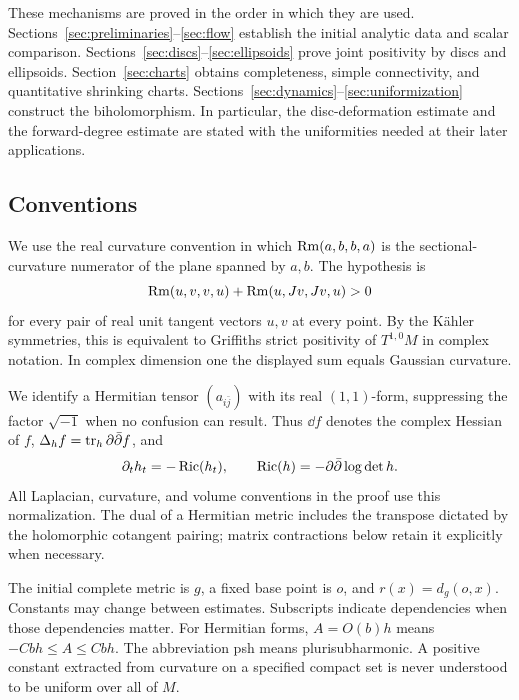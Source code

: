 These mechanisms are proved in the order in which they are used.
Sections~\ref{sec:preliminaries}--\ref{sec:flow} establish the initial
analytic data and scalar comparison. Sections~\ref{sec:discs}--\ref{sec:ellipsoids}
prove joint positivity by discs and ellipsoids.
Section~\ref{sec:charts} obtains completeness, simple connectivity,
and quantitative shrinking charts.
Sections~\ref{sec:dynamics}--\ref{sec:uniformization} construct the
biholomorphism. In particular, the disc-deformation estimate and
the forward-degree estimate are stated with the uniformities
needed at their later applications.

\subsection{Conventions}

We use the real curvature convention in which
$\operatorname{Rm}(a,b,b,a)$ is the sectional-curvature numerator of the plane
spanned by $a,b$. The hypothesis is
\[
 \operatorname{Rm}(u,v,v,u)+\operatorname{Rm}(u,Jv,Jv,u)>0
\]
for every pair of real unit tangent vectors $u,v$ at every point.
By the K\"ahler symmetries, this is equivalent to Griffiths strict
positivity of $T^{1,0}M$ in complex notation. In complex dimension
one the displayed sum equals Gaussian curvature.

We identify a Hermitian tensor $(a_{i\bar j})$ with its real
$(1,1)$-form, suppressing the factor $\sqrt{-1}$ when no confusion
can result. Thus $\dd f$ denotes the complex Hessian of $f$,
$\Delta_h f=\operatorname{tr}_h\partial\bar\partial f$, and
\[
 \partial_t h_t=-\operatorname{Ric}(h_t),\qquad
 \operatorname{Ric}(h)=-\partial\bar\partial\log\det h.
\]
All Laplacian, curvature, and volume conventions in the proof use
this normalization. The dual of a Hermitian metric includes the
transpose dictated by the holomorphic cotangent pairing; matrix
contractions below retain it explicitly when necessary.

The initial complete metric is $g$, a fixed base point is $o$,
and $r(x)=d_g(o,x)$. Constants may change between estimates.
Subscripts indicate dependencies when those dependencies matter.
For Hermitian forms, $A=O(b)h$ means $-Cbh\leq A\leq Cbh$.
The abbreviation psh means plurisubharmonic. A positive constant
extracted from curvature on a specified compact set is never
understood to be uniform over all of $M$.
